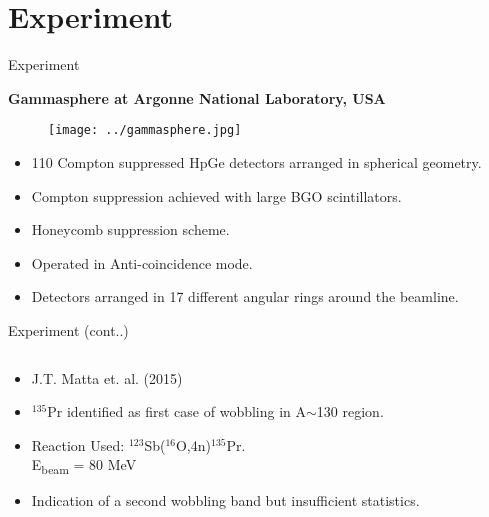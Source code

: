 \documentclass [11pt]{beamer}
\begin{document}
\section{Experiment}

\begin{frame}{Experiment}
\begin{center}
\textbf{Gammasphere at Argonne National Laboratory, USA}
\end{center}
\begin{multicols}{2}
\begin{figure}
\texttt{[image: ../gammasphere.jpg]}
\end{figure}
\begin{itemize}
\item{110 Compton suppressed HpGe detectors arranged in spherical geometry.}
\item{Compton suppression achieved with large BGO scintillators.}
\item{Honeycomb suppression scheme.}
\item{Operated in Anti-coincidence mode.}
\item{Detectors arranged in 17 different angular rings around the beamline.}
\end{itemize}
\end{multicols}
\end{frame}

\begin{frame}{Experiment (cont..)}
\begin{columns}[c]
\begin{column}{0.5\textwidth}
\textbf{}
\begin{itemize}
\item{J.T. Matta et. al. (2015)}
\item{$^{135}$Pr identified as first case of wobbling in A$\sim$130 region.}
\item{Reaction Used: $^{123}$Sb($^{16}$O,4n)$^{135}$Pr. \\ E\textsubscript{beam} = 80 MeV}
\item{Indication of a second wobbling band but insufficient statistics.}
\end{itemize}
\end{column}

\begin{column}{0.5\textwidth}

\end{column}
\end{columns}
\end{frame}
\end{document}
